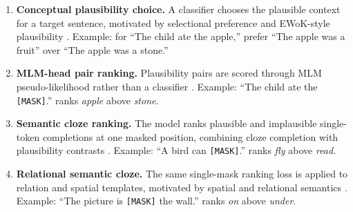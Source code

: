 \documentclass[11pt]{article}
\begin{document}
\begin{enumerate}
  \item \textbf{Conceptual plausibility choice.} A classifier chooses the plausible context for a target sentence, motivated by selectional preference and EWoK-style plausibility \citep{resnik1996selectional,ivanova2025ewok}. Example: for ``The child ate the apple,'' prefer ``The apple was a fruit'' over ``The apple was a stone.''
  \item \textbf{MLM-head pair ranking.} Plausibility pairs are scored through MLM pseudo-likelihood rather than a classifier \citep{salazar2020masked}. Example: ``The child ate the \texttt{[MASK]}.'' ranks \textit{apple} above \textit{stone}.
  \item \textbf{Semantic cloze ranking.} The model ranks plausible and implausible single-token completions at one masked position, combining cloze completion with plausibility contrasts \citep{taylor1953cloze,resnik1996selectional,ivanova2025ewok}. Example: ``A bird can \texttt{[MASK]}.'' ranks \textit{fly} above \textit{read}.
  \item \textbf{Relational semantic cloze.} The same single-mask ranking loss is applied to relation and spatial templates, motivated by spatial and relational semantics \citep{landau1993what,talmy2000cognitive}. Example: ``The picture is \texttt{[MASK]} the wall.'' ranks \textit{on} above \textit{under}.
\end{enumerate}
\end{document}
